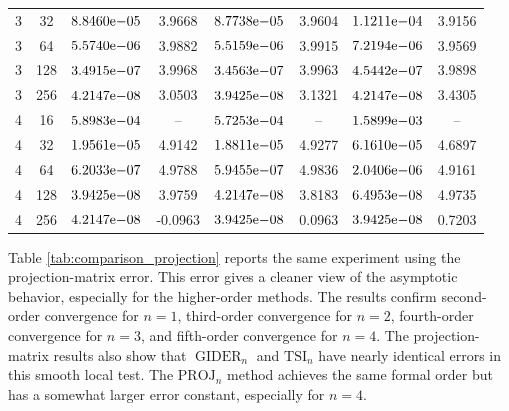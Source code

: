 \documentclass[a4paper,11pt]{article}
\newcommand{\GIDER}{\operatorname{GIDER}}
\numberwithin{equation}{section}
\theoremstyle{plain}
\theoremstyle{definition}
\theoremstyle{remark}
\begin{document}
\begin{table}[t]
{\begin{tabular}{cc|cc|cc|cc}
3 & 32  & \(8.8460{\rm e}{-05}\) & 3.9668 & \(8.7738{\rm e}{-05}\) & 3.9604 & \(1.1211{\rm e}{-04}\) & 3.9156 \\
3 & 64  & \(5.5740{\rm e}{-06}\) & 3.9882 & \(5.5159{\rm e}{-06}\) & 3.9915 & \(7.2194{\rm e}{-06}\) & 3.9569 \\
3 & 128 & \(3.4915{\rm e}{-07}\) & 3.9968 & \(3.4563{\rm e}{-07}\) & 3.9963 & \(4.5442{\rm e}{-07}\) & 3.9898 \\
3 & 256 & \(4.2147{\rm e}{-08}\) & 3.0503 & \(3.9425{\rm e}{-08}\) & 3.1321 & \(4.2147{\rm e}{-08}\) & 3.4305 \\
\midrule
4 & 16  & \(5.8983{\rm e}{-04}\) & --     & \(5.7253{\rm e}{-04}\) & --     & \(1.5899{\rm e}{-03}\) & --     \\
4 & 32  & \(1.9561{\rm e}{-05}\) & 4.9142 & \(1.8811{\rm e}{-05}\) & 4.9277 & \(6.1610{\rm e}{-05}\) & 4.6897 \\
4 & 64  & \(6.2033{\rm e}{-07}\) & 4.9788 & \(5.9455{\rm e}{-07}\) & 4.9836 & \(2.0406{\rm e}{-06}\) & 4.9161 \\
4 & 128 & \(3.9425{\rm e}{-08}\) & 3.9759 & \(4.2147{\rm e}{-08}\) & 3.8183 & \(6.4953{\rm e}{-08}\) & 4.9735 \\
4 & 256 & \(4.2147{\rm e}{-08}\) & -0.0963 & \(3.9425{\rm e}{-08}\) & 0.0963 & \(3.9425{\rm e}{-08}\) & 0.7203 \\
\bottomrule
\end{tabular}
}
\end{table}

Table \ref{tab:comparison_projection} reports the same experiment using the projection-matrix error.  This error gives a cleaner view of the asymptotic behavior, especially for the higher-order methods.  The results confirm second-order convergence for \(n=1\), third-order convergence for \(n=2\), fourth-order convergence for \(n=3\), and fifth-order convergence for \(n=4\).  The projection-matrix results also show that \(\GIDER_n\) and \(\mathrm{TSI}_n\) have nearly identical errors in this smooth local test.  The \(\mathrm{PROJ}_n\) method achieves the same formal order but has a somewhat larger error constant, especially for \(n=4\).
\end{document}
